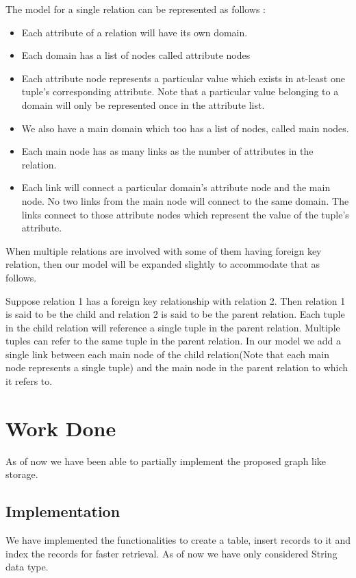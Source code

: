 \documentclass[12pt, oneside]{book}
\begin{document}
\par The model for a single relation can be represented as follows :
\begin{itemize}
 \item Each attribute of a relation will have its own domain.
 \item Each domain has a list of nodes called attribute nodes
 \item Each attribute node represents a particular value which exists in at-least one tuple's corresponding attribute. Note that a particular value belonging to a domain will only be represented once in the attribute list.
 \item We also have a main domain which too has a list of nodes, called main nodes.
 \item Each main node has as many links as the number of attributes in the relation.
 \item Each link will connect a particular domain's attribute node and the main node. No two links from the main node will connect to the same domain. The links connect to those attribute nodes which represent the value of the tuple's attribute.
\end{itemize}
When multiple relations are involved with some of them having foreign key relation, then our model will be expanded slightly to accommodate that as follows.\\
\par Suppose relation 1 has a foreign key relationship with relation 2. Then relation 1 is said to be the child and relation 2 is said to be the parent relation. Each tuple in the child relation will reference a single tuple in the parent relation. Multiple tuples can refer to the same tuple in the parent relation. In our model we add a single link between each main node of the child relation(Note that each main node represents a single tuple) and the main node in the parent relation to which it refers to.

\chapter{Work Done}
As of now we have been able to partially implement the proposed graph like storage.
\section{Implementation}
We have implemented the functionalities to create a table, insert records to it and index the records for faster retrieval. As of now we have only considered String data type.
\end{document}
